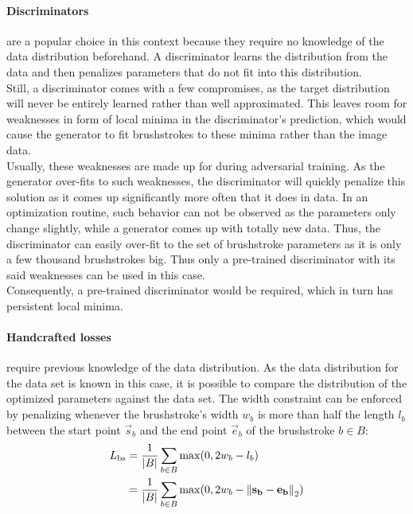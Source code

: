 \paragraph{Discriminators} are a popular choice in this context because they require no knowledge of the data distribution beforehand.
A discriminator learns the distribution from the data and then penalizes parameters that do not fit into this distribution.\\
Still, a discriminator comes with a few compromises, as the target distribution will never be entirely learned rather than well approximated.
This leaves room for weaknesses in form of local minima in the discriminator's prediction, which would cause the generator to fit brushstrokes to these minima rather than the image data.\\
Usually, these weaknesses are made up for during adversarial training.
As the generator over-fits to such weaknesses, the discriminator will quickly penalize this solution as it comes up significantly more often that it does in data.
In an optimization routine, such behavior can not be observed as the parameters only change slightly, while a generator comes up with totally new data.
Thus, the discriminator can easily over-fit to the set of brushstroke parameters as it is only a few thousand brushstrokes big.
Thus only a pre-trained discriminator with its said weaknesses can be used in this case.\\
Consequently, a pre-trained discriminator would be required, which in turn has persistent local minima.

\paragraph{Handcrafted losses} require previous knowledge of the data distribution.
As the data distribution for the data set is known in this case, it is possible to compare the distribution of the optimized parameters against the data set.
The width constraint can be enforced by penalizing whenever the brushstroke's width $w_b$ is more than half the length $l_b$ between the start point $\vec{s}_b$ and the end point $\vec{e}_b$ of the brushstroke $b \in B$:
\begin{align}
    L_{\text{bs}} & = \frac{1}{\vert B \vert}\sum_{b \in B} \max(0, 2w_b - l_b) \\
    & = \frac{1}{\vert B \vert}\sum_{b \in B} \max(0, 2w_b - \left\lVert\mathbf{s_b} - \mathbf{e_b}\right\rVert_2)
\end{align}

